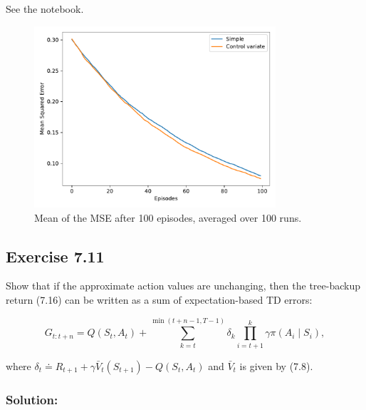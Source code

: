 See the notebook.

\begin{figure}[H]
    \centering
    \includegraphics[width=0.8\textwidth]{chapters_latex/figures/ex_07_10.pdf}
    \captionsetup{labelformat=empty}
    \caption{Mean of the MSE after 100 episodes, averaged over 100 runs.}
\end{figure}

\subsection*{Exercise 7.11}
Show that if the approximate action values are unchanging, then the tree-backup return (7.16)
 can be written as a sum of expectation-based TD errors:

\[
G_{t:t+n} = Q(S_t, A_t) + \sum_{k=t}^{\min(t+n-1, T-1)} \delta_k \prod_{i=t+1}^k \gamma \pi(A_i \mid S_i),
\]

where $\delta_t \doteq R_{t+1} + \gamma \bar{V}_t(S_{t+1}) - Q(S_t, A_t)$ and $\bar{V}_t$ is given by (7.8).

\subsubsection*{Solution:}


